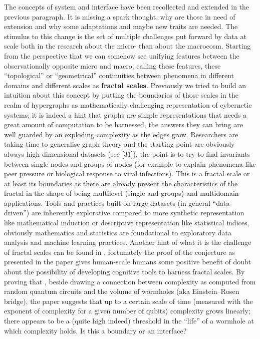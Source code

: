 \documentclass[14pt]{extarticle}
\begin{document}
\hspace*{15mm}The concepts of system and interface have been recollected and extended in the previous paragraph. It is missing a spark thought, why are those in need of extension and why some adaptations and maybe new traits are needed. The stimulus to this change is the set of multiple challenges put forward by data at scale both in the research about the micro- than about the macrocosm. Starting from the perspective that we can somehow see unifying features between the observationally opposite micro and macro; calling these features, these “topological” or “geometrical” continuities between phenomena in different domains and different scales as \textbf{fractal scales}. Previously we tried to build an intuition about this concept by putting the boundaries of those scales in the realm of hypergraphs as mathematically challenging representation of cybernetic systems; it is indeed a hint that graphs are simple representations that needs a great amount of computation to be harnessed, the answers they can bring are well guarded by an exploding complexity as the edges grow.
\newline
\hspace*{15mm}Researchers are taking time to generalise graph theory and the starting point are obviously always high-dimensional datasets (see [31]), the point is to try to find invariants between single nodes and groups of nodes (for example to explain phenomena like peer pressure or biological response to viral infections). This is a fractal scale or at least its boundaries as there are already present the characteristics of the fractal in the shape of being multilevel (single and groups) and multidomain applications. Tools and practices built on large datasets (in general “data-driven”) are inherently explorative compared to more synthetic representation like mathematical induction or descriptive representation like statistical indices, obviously mathematics and statistics are foundational to exploratory data analysis and machine learning practices.
\newline
\hspace*{15mm}Another hint of what it is the challenge of fractal scales can be found in \cite{haferkamp2022linear}, fortunately the proof of the conjecture as presented in the paper gives human-scale humans some positive benefit of doubt about the possibility of developing cognitive tools to harness fractal scales. By proving that , beside drawing a connection between complexity as computed from random quantum circuits and the volume of wormholes (aka Einstein–Rosen bridge), the paper suggests that up to a certain scale of time (measured with the exponent of complexity for a given number of qubits) complexity grows linearly; there appears to be a (quite high indeed) threshold in the “life” of a wormhole at which complexity holds. Is this a boundary or an interface?
\end{document}
